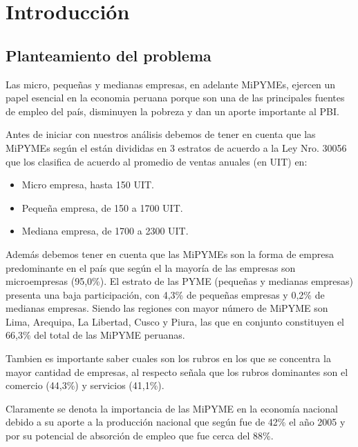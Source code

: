 
\chapter{Introducción}

\section{Planteamiento del problema}
Las micro, pequeñas y medianas empresas, en adelante MiPYMEs, ejercen un papel
esencial en la economia peruana porque son una de las principales fuentes de empleo
del país, disminuyen la pobreza y dan un aporte importante al PBI.

Antes de iniciar con nuestros análisis debemos de tener en cuenta que las MiPYMEs
según el \cite{produce2} están divididas en 3 estratos de acuerdo
a la Ley Nro. 30056 que los clasifica de acuerdo al promedio de ventas anuales
(en UIT) en:
\begin{itemize}
  \item Micro empresa, hasta 150 UIT.
  \item Pequeña empresa, de 150 a 1700 UIT.
  \item Mediana empresa, de 1700 a 2300 UIT.
\end{itemize}

Además debemos tener en cuenta que las MiPYMEs son la forma de empresa predominante
en el país que según el \cite{produce} la mayoría de las empresas son
microempresas (95,0\%). El estrato de las PYME (pequeñas y medianas empresas) presenta una baja participación,
con 4,3\% de pequeñas empresas y 0,2\% de medianas empresas. Siendo las regiones
con mayor número de MiPYME son Lima, Arequipa, La Libertad, Cusco y Piura, las que
en conjunto constituyen el 66,3\% del total de las MiPYME peruanas.

Tambien es importante saber cuales son los rubros en los que se concentra la mayor cantidad de empresas,
al respecto \cite{produce} señala que los rubros dominantes son el comercio (44,3\%) y servicios (41,1\%).

Claramente se denota la importancia de las MiPYME en la economía nacional debido a su aporte a la
producción nacional que según \cite{arbulu} fue de 42\% el año 2005 y por
su potencial de absorción de empleo que fue cerca del 88\%.

